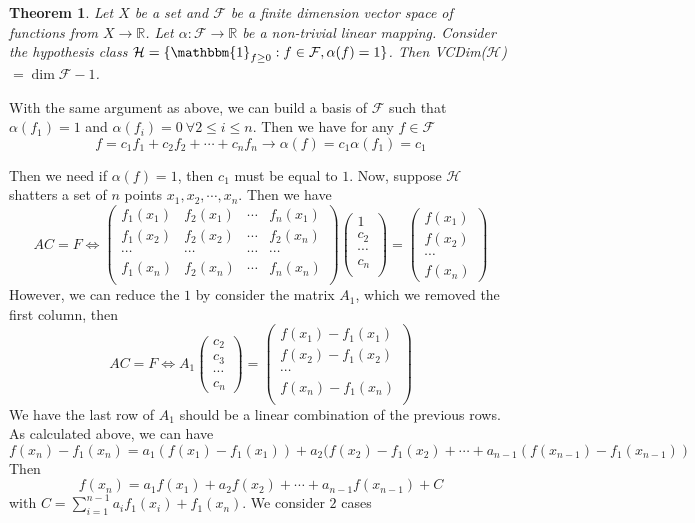 \documentclass{article}
\newtheorem{theorem}{Theorem}[section]
\begin{document}
\begin{theorem}
Let $X$ be a set and $\mathcal{F}$ be a finite dimension vector space of functions from $X \rightarrow \mathbb{R}$. Let $\alpha: \mathcal{F} \rightarrow \mathbb{R}$ be a non-trivial linear mapping. Consider the hypothesis class $\mathcal{H} = \{ \mathbbm{1}_{f \ge 0}: f \in \mathcal{F},\alpha(f) = 1 \}$. Then VCDim($\mathcal{H}$) $= \dim \mathcal{F}-1$.
\end{theorem}

With the same argument as above, we can build a basis of $\mathcal{F}$ such that $\alpha(f_1)=1$ and $\alpha(f_i)=0 \ \forall 2 \leq i \leq n$. Then we have for any $f \in \mathcal{F}$
$$f=c_1f_1+c_2f_2+\cdots+c_nf_n \rightarrow \alpha(f)=c_1\alpha(f_1)=c_1$$

Then we need if $\alpha(f)=1$, then $c_1$ must be equal to $1$. Now, suppose $\mathcal{H}$ shatters a set of $n$ points $x_1,x_2,\cdots,x_n$. Then we have $$AC=F \iff \begin{pmatrix}
f_1(x_1) & f_2(x_1) & \cdots & f_n(x_1)\\
f_1(x_2) & f_2(x_2) & \cdots & f_2(x_n)\\
\cdots & \cdots & \cdots & \cdots\\
f_1(x_n) & f_2(x_n) & \cdots & f_n(x_n)\\
\end{pmatrix}\begin{pmatrix}
1\\
c_2\\
\cdots\\
c_n\\
\end{pmatrix}=\begin{pmatrix}
f(x_1)\\
f(x_2)\\
\cdots\\
f(x_n)
\end{pmatrix}$$
However, we can reduce the $1$ by consider the matrix $A_1$, which we removed the first column, then
$$AC=F \iff A_1\begin{pmatrix}
c_2\\
c_3\\
\cdots\\
c_n
\end{pmatrix}=\begin{pmatrix}
f(x_1)-f_1(x_1)\\
f(x_2)-f_1(x_2)\\
\cdots\\
f(x_n)-f_1(x_n)\\
\end{pmatrix}$$
We have the last row of $A_1$ should be a linear combination of the previous rows. As calculated above, we can have
$$f(x_n)-f_1(x_n)=a_1(f(x_1)-f_1(x_1))+a_2(f(x_2)-f_1(x_2)+\cdots+a_{n-1}(f(x_{n-1})-f_1(x_{n-1}))$$
Then
$$f(x_n)=a_1f(x_1)+a_2f(x_2)+\cdots+a_{n-1}f(x_{n-1})+C$$
with $C=\displaystyle \sum_{i=1}^{n-1}a_if_1(x_i)+f_1(x_n)$. We consider $2$ cases
\end{document}
